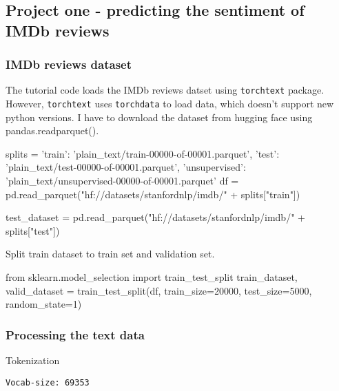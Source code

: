 \subsection{Project one - predicting the sentiment of IMDb reviews}
\subsubsection{IMDb reviews dataset}
The tutorial code loads the IMDb reviews datset using \texttt{torchtext} package. However, \texttt{torchtext} uses \texttt{torchdata} to load data, which doesn't support new python versions. I have to download the dataset from hugging face using pandas.readparquet().

\begin{pythoncode}
splits = {'train': 'plain_text/train-00000-of-00001.parquet', 'test': 'plain_text/test-00000-of-00001.parquet', 'unsupervised': 'plain_text/unsupervised-00000-of-00001.parquet'}
df = pd.read_parquet("hf://datasets/stanfordnlp/imdb/" + splits["train"])

test_dataset = pd.read_parquet("hf://datasets/stanfordnlp/imdb/" + splits["test"])
\end{pythoncode}

Split train dataset to train set and validation set.
\begin{pythoncode}
from sklearn.model_selection import train_test_split
train_dataset, valid_dataset = train_test_split(df, train_size=20000, test_size=5000, random_state=1)
\end{pythoncode}

\subsubsection{Processing the text data}
Tokenization

\begin{verbatim}
Vocab-size: 69353
\end{verbatim}

